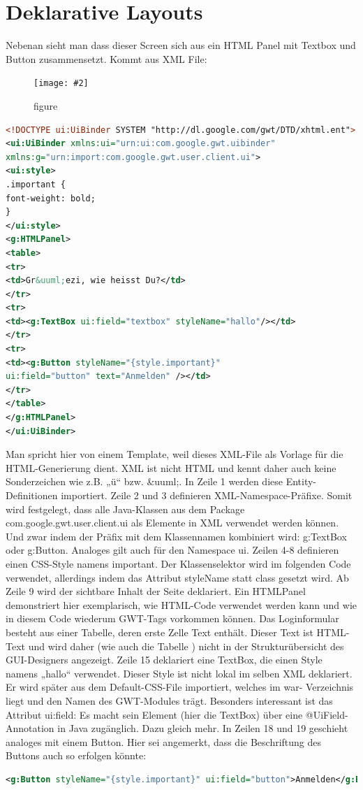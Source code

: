 \documentclass[a4paper,10pt]{scrreprt}
\newcommand{\pic}[2][figure]{\begin{figure}[h]
 \centering
 \texttt{[image: \#2]}
 \caption{#1}
\end{figure}
}
\begin{document}
\section{Deklarative Layouts}
Nebenan sieht man dass dieser Screen sich aus ein HTML Panel mit Textbox und Button zusammensetzt. Kommt aus XML File:
\pic{deklgui.png}
\begin{lstlisting}[language=xml]
 <!DOCTYPE ui:UiBinder SYSTEM "http://dl.google.com/gwt/DTD/xhtml.ent">
<ui:UiBinder xmlns:ui="urn:ui:com.google.gwt.uibinder"
xmlns:g="urn:import:com.google.gwt.user.client.ui">
<ui:style>
.important {
font-weight: bold;
}
</ui:style>
<g:HTMLPanel>
<table>
<tr>
<td>Gr&uuml;ezi, wie heisst Du?</td>
</tr>
<tr>
<td><g:TextBox ui:field="textbox" styleName="hallo"/></td>
</tr>
<tr>
<td><g:Button styleName="{style.important}"
ui:field="button" text="Anmelden" /></td>
</tr>
</table>
</g:HTMLPanel>
</ui:UiBinder>
\end{lstlisting}
Man spricht hier von einem Template, weil dieses XML-File als Vorlage für die HTML-Generierung
dient. XML ist nicht HTML und kennt daher auch keine Sonderzeichen wie z.B. „ü“ bzw. \&uuml;. In
Zeile 1 werden diese Entity-Definitionen importiert.
Zeile 2 und 3 definieren XML-Namespace-Präfixe. Somit wird festgelegt, dass alle Java-Klassen aus
dem Package com.google.gwt.user.client.ui als Elemente in XML verwendet werden
können. Und zwar indem der Präfix mit dem Klassennamen kombiniert wird: g:TextBox oder
g:Button. Analoges gilt auch für den Namespace ui.
Zeilen 4-8 definieren einen CSS-Style namens important. Der Klassenselektor wird im folgenden Code
verwendet, allerdings indem das Attribut styleName statt class gesetzt wird.
Ab Zeile 9 wird der sichtbare Inhalt der Seite deklariert. Ein HTMLPanel demonstriert hier
exemplarisch, wie HTML-Code verwendet werden kann und wie in diesem Code wiederum GWT-Tags
vorkommen können. Das Loginformular besteht aus einer Tabelle, deren erste Zelle Text enthält.
Dieser Text ist HTML-Text und wird daher (wie auch die Tabelle ) nicht in der Strukturübersicht des
GUI-Designers angezeigt.
Zeile 15 deklariert eine TextBox, die einen Style namens „hallo“ verwendet. Dieser Style ist nicht lokal
im selben XML deklariert. Er wird später aus dem Default-CSS-File importiert, welches im war-
Verzeichnis liegt und den Namen des GWT-Modules trägt. Besonders interessant ist das Attribut
ui:field: Es macht sein Element (hier die TextBox) über eine @UiField-Annotation in Java
zugänglich. Dazu gleich mehr.
In Zeilen 18 und 19 geschieht analoges mit einem Button. Hier sei angemerkt, dass die Beschriftung
des Buttons auch so erfolgen könnte:
\begin{lstlisting}[language=xml]
 <g:Button styleName="{style.important}" ui:field="button">Anmelden</g:Button>
\end{lstlisting}
\end{document}
